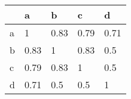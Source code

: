 \begin{tabular}{lllll}
\toprule
{} &     a &     b &     c &     d \\
\midrule
a &     1 &  0.83 &  0.79 &  0.71 \\
b &  0.83 &     1 &  0.83 &   0.5 \\
c &  0.79 &  0.83 &     1 &   0.5 \\
d &  0.71 &   0.5 &   0.5 &     1 \\
\bottomrule
\end{tabular}
